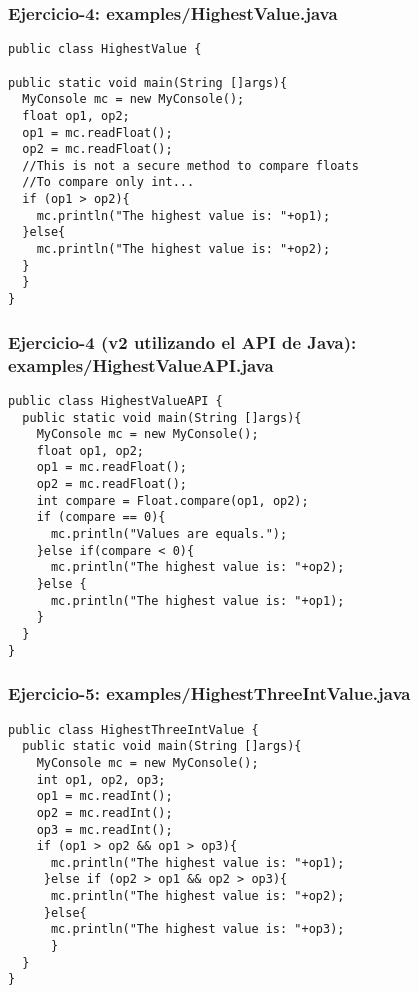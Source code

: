 \documentclass[xcolor=dvipsnames,dvip,notes=show,handout,table]{beamer}
\begin{document}


\begin{frame}[fragile]
\frametitle{Ejercicio-4: examples/HighestValue.java}
\scriptsize
\begin{lstlisting}
public class HighestValue {

public static void main(String []args){
  MyConsole mc = new MyConsole();
  float op1, op2;
  op1 = mc.readFloat();
  op2 = mc.readFloat();
  //This is not a secure method to compare floats
  //To compare only int...
  if (op1 > op2){
    mc.println("The highest value is: "+op1);	
  }else{
    mc.println("The highest value is: "+op2);
  }
  }
}
\end{lstlisting}
\end{frame}

\begin{frame}[fragile]
\frametitle{Ejercicio-4 (v2 utilizando el API de Java): examples/HighestValueAPI.java}
\scriptsize
\begin{lstlisting}
public class HighestValueAPI {
  public static void main(String []args){
    MyConsole mc = new MyConsole();
    float op1, op2;
    op1 = mc.readFloat();
    op2 = mc.readFloat();
    int compare = Float.compare(op1, op2); 
    if (compare == 0){
      mc.println("Values are equals.");	
    }else if(compare < 0){
      mc.println("The highest value is: "+op2);
    }else {
      mc.println("The highest value is: "+op1);
    }
  }
}
\end{lstlisting}
\end{frame}




\begin{frame}[fragile]
\frametitle{Ejercicio-5: examples/HighestThreeIntValue.java}
\scriptsize
\begin{lstlisting}
public class HighestThreeIntValue {
  public static void main(String []args){
    MyConsole mc = new MyConsole();
    int op1, op2, op3;
    op1 = mc.readInt();
    op2 = mc.readInt();
    op3 = mc.readInt();
    if (op1 > op2 && op1 > op3){
      mc.println("The highest value is: "+op1);
     }else if (op2 > op1 && op2 > op3){
      mc.println("The highest value is: "+op2);
     }else{
      mc.println("The highest value is: "+op3);
      }
  }
}
\end{lstlisting}
\end{frame}
\end{document}
